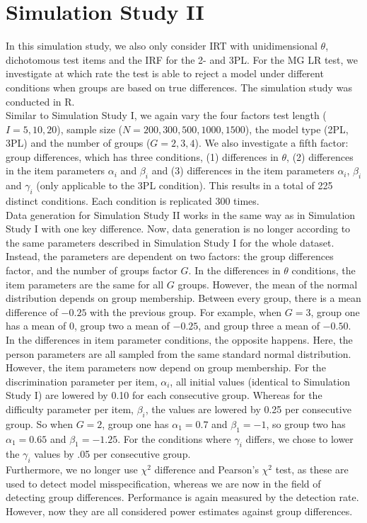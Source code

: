 \documentclass[Royal,sageapa,times,doublespace]{sagej}
\begin{document}
\section{Simulation Study II}
In this simulation study, we also only consider IRT with unidimensional $\theta$, dichotomous test items and the IRF for the 2- and 3PL. For the MG LR test, we investigate at which rate the test is able to reject a model under different conditions when groups are based on true differences. The simulation study was conducted in R. \\
\indent Similar to Simulation Study I, we again vary the four factors test length ($I = 5, 10, 20$), sample size ($N = 200, 300, 500, 1000, 1500$), the model type (2PL, 3PL) and the number of groups ($G = 2, 3, 4$). We also investigate a fifth factor: group differences, which has three conditions, (1) differences in $\theta$, (2) differences in the item parameters $\alpha_i$ and $\beta_i$ and (3) differences in the item parameters $\alpha_i$, $\beta_i$ and $\gamma_i$ (only applicable to the 3PL condition). This results in a total of 225 distinct conditions. Each condition is replicated 300 times. \\
\indent Data generation for Simulation Study II works in the same way as in Simulation Study I with one key difference. Now, data generation is no longer according to the same parameters described in Simulation Study I for the whole dataset. Instead, the parameters are dependent on two factors: the group differences factor, and the number of groups factor $G$. In the differences in $\theta$ conditions, the item parameters are the same for all $G$ groups. However, the mean of the normal distribution depends on group membership. Between every group, there is a mean difference of $-0.25$ with the previous group. For example, when $G = 3$, group one has a mean of 0, group two a mean of $-0.25$, and group three a mean of $-0.50$. In the differences in item parameter conditions, the opposite happens. Here, the person parameters are all sampled from the same standard normal distribution. However, the item parameters now depend on group membership. For the discrimination parameter per item, $\alpha_i$, all initial values (identical to Simulation Study I) are lowered by 0.10 for each consecutive group. Whereas for the difficulty parameter per item, $\beta_i$, the values are lowered by 0.25 per consecutive group. So when $G = 2$, group one has $\alpha_1 = 0.7$ and $\beta_1 = -1$, so group two has $\alpha_1 = 0.65$ and $\beta_1 = -1.25$. For the conditions where $\gamma_i$ differs, we chose to lower the $\gamma_i$ values by .05 per consecutive group. \\
\indent Furthermore, we no longer use $\chi^2$ difference and Pearson's $\chi^2$ test, as these are used to detect model misspecification, whereas we are now in the field of detecting group differences. Performance is again measured by the detection rate. However, now they are all considered power estimates against group differences.
\end{document}
